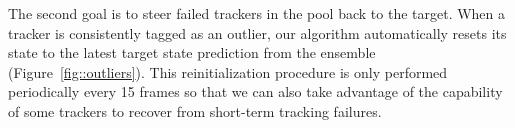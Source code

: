 The second goal is to steer failed trackers in the pool back to the target.
When a tracker is consistently tagged as an outlier, our algorithm automatically
resets its state to the latest target state prediction from the ensemble
(Figure~\ref{fig::outliers}).
This reinitialization procedure is only performed periodically every 15 frames
so that we can also take advantage of the capability of some trackers
to recover from short-term tracking failures.


